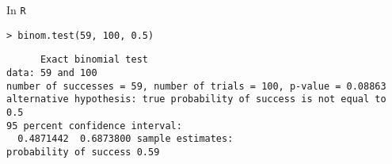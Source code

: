 \begin{frame}
  {In \texttt{R}}
  \begin{center}
    \texttt{> binom.test(59, 100, 0.5)}
  \end{center}
\tt\footnotesize
\ \ \ \ \ Exact binomial test\\[4ex]

data:  59 and 100\\
number of successes = 59, number of trials = 100, p-value = 0.08863\\
alternative hypothesis: true probability of success is not equal to 0.5\\
95 percent confidence interval:\\
\ \ 0.4871442\ \ 0.6873800
sample estimates:\\
probability of success 0.59 \\
\end{frame}
